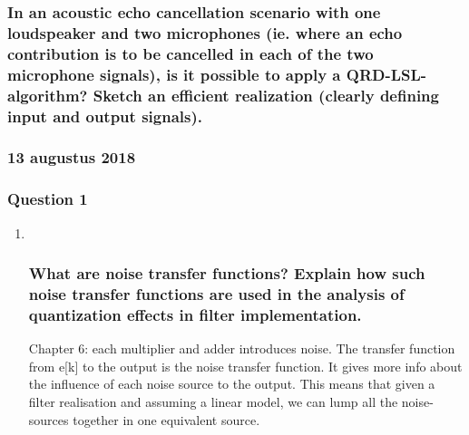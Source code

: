 \documentclass[
  a4paper,
  ,captions=tableheading
]{scrartcl}
\begin{document}
\begin{enumerate}
  \subsubsection{In an acoustic echo cancellation scenario with one
  loudspeaker and two microphones (ie. where an echo contribution is to
  be cancelled in each of the two microphone signals), is it possible to
  apply a QRD-LSL-algorithm? Sketch an efficient realization (clearly
  defining input and output
  signals).}\label{in-an-acoustic-echo-cancellation-scenario-with-one-loudspeaker-and-two-microphones-ie.-where-an-echo-contribution-is-to-be-cancelled-in-each-of-the-two-microphone-signals-is-it-possible-to-apply-a-qrd-lsl-algorithm-sketch-an-efficient-realization-clearly-defining-input-and-output-signals.}
\end{enumerate}

\subsubsection{}\label{section-21}

\subsubsection{\texorpdfstring{\textbf{13 augustus
2018}}{13 augustus 2018}}\label{augustus-2018}

\subsubsection{Question 1}\label{question-1-4}

\begin{enumerate}
\def\labelenumi{\arabic{enumi}.}
\item ~
  \subsubsection{What are noise transfer functions? Explain how such
  noise transfer functions are used in the analysis of quantization
  effects in filter
  implementation.}\label{what-are-noise-transfer-functions-explain-how-such-noise-transfer-functions-are-used-in-the-analysis-of-quantization-effects-in-filter-implementation.-1}

  Chapter 6: each multiplier and adder introduces noise. The transfer
  function from e{[}k{]} to the output is the noise transfer function.
  It gives more info about the influence of each noise source to the
  output. This means that given a filter realisation and assuming a
  linear model, we can lump all the noise-sources together in one
  equivalent source.
\end{enumerate}
\end{document}
